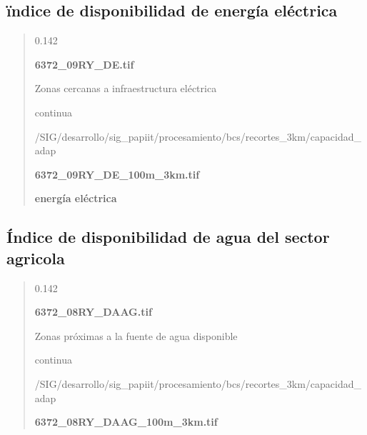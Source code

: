 \documentclass[letterpaper,10pt,spanish]{sphinxmanual}
\begin{document}
\subsection{ïndice de disponibilidad de energía eléctrica}
\label{\detokenize{resiliencia_bcs:indice-de-disponibilidad-de-energia-electrica}}
\begin{quote}

 0.142

 {\color{red}\bfseries{}\textbar{}6372\_09RY\_DE.tif\textbar{}}

 Zonas cercanas a infraestructura eléctrica

 continua


 /SIG/desarrollo/sig\_papiit/procesamiento/bcs/recortes\_3km/capacidad\_adap

  {\color{red}\bfseries{}\textbar{}6372\_09RY\_DE\_100m\_3km.tif\textbar{}}

 {\color{red}\bfseries{}\textbar{}energía eléctrica\textbar{}}
\end{quote}


\subsection{Índice de disponibilidad de agua del sector agricola}
\label{\detokenize{resiliencia_bcs:indice-de-disponibilidad-de-agua-del-sector-agricola}}
\begin{quote}

 0.142

 {\color{red}\bfseries{}\textbar{}6372\_08RY\_DAAG.tif\textbar{}}

 Zonas próximas a la fuente de agua disponible

 continua


 /SIG/desarrollo/sig\_papiit/procesamiento/bcs/recortes\_3km/capacidad\_adap

  {\color{red}\bfseries{}\textbar{}6372\_08RY\_DAAG\_100m\_3km.tif\textbar{}}

\end{quote}
\end{document}
